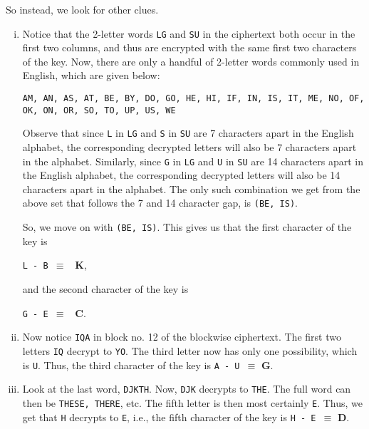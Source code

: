 \documentclass[11pt]{article}
\begin{document}
\begin{enumerate}
  \pagebreak

  So instead, we look for other clues.

  \begin{enumerate}[i.]
    \item Notice that the 2-letter words \texttt{LG} and \texttt{SU} in the ciphertext both occur in the first two columns, and thus are encrypted with the same first two characters of the key. Now, there are only a handful of 2-letter words commonly used in English, which are given below: 
    
    \begin{center}
      \texttt{AM, AN, AS, AT, BE, BY, DO, GO, HE, HI, IF, IN, IS, IT, ME, NO, OF, OK, ON, OR, SO, TO, UP, US, WE}
    \end{center}

    Observe that since \texttt{L} in \texttt{LG} and \texttt{S} in \texttt{SU} are 7 characters apart in the English alphabet, the corresponding decrypted letters will also be 7 characters apart in the alphabet. Similarly, since \texttt{G} in \texttt{LG} and \texttt{U} in \texttt{SU} are 14 characters apart in the English alphabet, the corresponding decrypted letters will also be 14 characters apart in the alphabet. The only such combination we get from the above set that follows the 7 and 14 character gap, is \texttt{(BE, IS)}. 

    So, we move on with \texttt{(BE, IS)}. This gives us that the first character of the key is 
    
    \texttt{L - B $\equiv$ } \textbf{K},

    and the second character of the key is 

    \texttt{G - E $\equiv$ } \textbf{C}.
    \bigskip

    \item Now notice \texttt{IQA} in block no. 12 of the blockwise ciphertext. The first two letters \texttt{IQ} decrypt to \texttt{YO}. The third letter now has only one possibility, which is \texttt{U}. Thus, the third character of the key is \texttt{A - U $\equiv$} \textbf{G}.
    
    \item Look at the last word, \texttt{DJKTH}. Now, \texttt{DJK} decrypts to \texttt{THE}. The full word can then be \texttt{THESE, THERE}, etc. The fifth letter is then most certainly \texttt{E}. Thus, we get that \texttt{H} decrypts to \texttt{E}, i.e., the fifth character of the key is \texttt{H - E $\equiv$} \textbf{D}.
    

\end{enumerate}
\end{enumerate}
\end{document}
